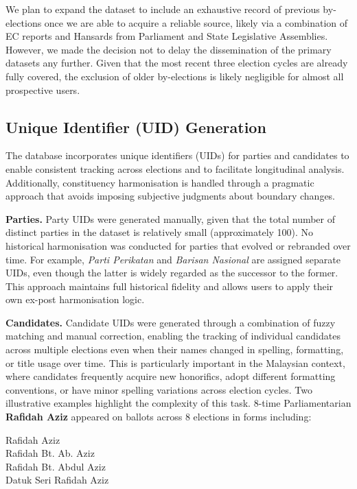 \documentclass[11pt]{article}
\begin{document}
We plan to expand the dataset to include an exhaustive record of previous by-elections once we are able to acquire a reliable source, likely via a combination of EC reports and Hansards from Parliament and State Legislative Assemblies. However, we made the decision not to delay the dissemination of the primary \acronym datasets any further. Given that the most recent three election cycles are already fully covered, the exclusion of older by-elections is likely negligible for almost all prospective users.

\subsection*{Unique Identifier (UID) Generation}

The database incorporates unique identifiers (UIDs) for parties and candidates to enable consistent tracking across elections and to facilitate longitudinal analysis. Additionally, constituency harmonisation is handled through a pragmatic approach that avoids imposing subjective judgments about boundary changes.

\textbf{Parties.}
Party UIDs were generated manually, given that the total number of distinct parties in the dataset is relatively small (approximately 100). No historical harmonisation was conducted for parties that evolved or rebranded over time. For example, \textit{Parti Perikatan} and \textit{Barisan Nasional} are assigned separate UIDs, even though the latter is widely regarded as the successor to the former. This approach maintains full historical fidelity and allows users to apply their own ex-post harmonisation logic.

\textbf{Candidates.}
Candidate UIDs were generated through a combination of fuzzy matching and manual correction, enabling the tracking of individual candidates across multiple elections even when their names changed in spelling, formatting, or title usage over time. This is particularly important in the Malaysian context, where candidates frequently acquire new honorifics, adopt different formatting conventions, or have minor spelling variations across election cycles. Two illustrative examples highlight the complexity of this task. 8-time Parliamentarian \textbf{Rafidah Aziz} appeared on ballots across 8 elections in forms including:

\begin{centering}

Rafidah Aziz\\
Rafidah Bt. Ab. Aziz\\
Rafidah Bt. Abdul Aziz\\
Datuk Seri Rafidah Aziz

\end{centering}
\end{document}
